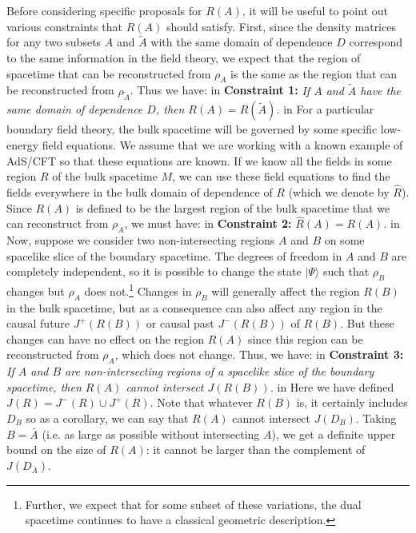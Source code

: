 \documentclass[12pt]{article}
\renewcommand{\(}{\left(}
\renewcommand{\)}{\right)}
\begin{document}
Before considering specific proposals for $R(A)$, it will be useful to point out various constraints that $R(A)$ should satisfy. First, since the density matrices for any two subsets $A$ and $\tilde A$ with the same domain of dependence $D$ correspond to the same information in the field theory, we expect that the region of spacetime that can be reconstructed from $\rho_A$ is the same as the region that can be reconstructed from $\rho_{\tilde A}$. Thus we have:
 in
\noindent
{\bf Constraint 1:}  {\it If $A$ and $\tilde A$ have the same domain of dependence $D$, then $R(A)= R(\tilde A)$.}
 in
\noindent
For a particular boundary field theory, the bulk spacetime will be governed by some specific low-energy field equations. We assume that we are working with a known example of AdS/CFT so that these equations are known. If we know all the fields in some region $R$ of the bulk spacetime $M$, we can use these field equations to find the fields everywhere in the bulk domain of dependence of $R$ (which we denote by $\hat{R}$). Since $R(A)$ is defined to be the largest region of the bulk spacetime that we can reconstruct from $\rho_A$, we must have:
 in
\noindent
{\bf Constraint 2:}  {\it $\hat{R}(A) = R(A)$.}
 in
\noindent
Now, suppose we consider two non-intersecting regions $A$ and $B$ on some spacelike slice of the boundary spacetime. The degrees of freedom in $A$ and $B$ are completely independent, so it is possible to change the state $|\Psi \rangle$ such that $\rho_B$ changes but $\rho_A$ does not.\footnote{Further, we expect that for some subset of these variations, the dual spacetime continues to have a classical geometric description.} Changes in $\rho_B$ will generally affect the region $R(B)$ in the bulk spacetime, but as a consequence can also affect any region in the causal future $J^+(R(B))$ or causal past $J^-(R(B))$ of $R(B)$. But these changes can have no effect on the region $R(A)$ since this region can be reconstructed from $\rho_A$, which does not change. Thus, we have:
 in
\noindent
{\bf Constraint 3:}  {\it If $A$ and $B$ are non-intersecting regions of a spacelike slice of the boundary spacetime, then $R(A)$ cannot intersect $J(R(B))$.}
 in
\noindent
Here we have defined $J(R) = J^-(R) \cup J^+(R)$. Note that whatever $R(B)$ is, it certainly includes $D_B$ so as a corollary, we can say that $R(A)$ cannot intersect $J(D_B)$. Taking $B = \bar{A}$ (i.e. as large as possible without intersecting $A$), we get a definite upper bound on the size of $R(A)$: it cannot be larger than the complement of $J(D_{\bar{A}})$.
\end{document}
